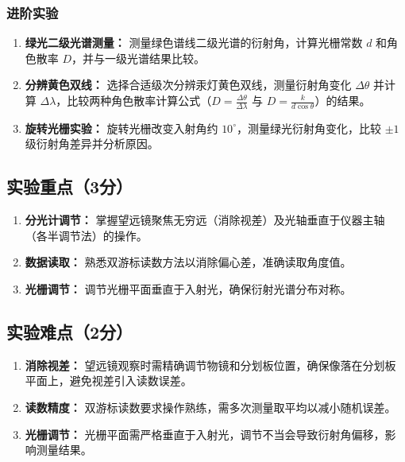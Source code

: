 \documentclass[]{../template/Report}%
\begin{document}
\subsubsection{进阶实验}
\begin{enumerate}
    \item \textbf{绿光二级光谱测量：} 测量绿色谱线二级光谱的衍射角，计算光栅常数 $d$ 和角色散率 $D$，并与一级光谱结果比较。
    \item \textbf{分辨黄色双线：} 选择合适级次分辨汞灯黄色双线，测量衍射角变化 $\Delta \theta$ 并计算 $\Delta \lambda$，比较两种角色散率计算公式（$D = \frac{\Delta \theta}{\Delta \lambda}$ 与 $D = \frac{k}{d \cos \theta}$）的结果。
    \item \textbf{旋转光栅实验：} 旋转光栅改变入射角约 $10^\circ$，测量绿光衍射角变化，比较 $\pm 1$ 级衍射角差异并分析原因。
\end{enumerate}

\subsection{实验重点（3分）}

\begin{enumerate}
    \item \textbf{分光计调节：} 掌握望远镜聚焦无穷远（消除视差）及光轴垂直于仪器主轴（各半调节法）的操作。
    \item \textbf{数据读取：} 熟悉双游标读数方法以消除偏心差，准确读取角度值。
    \item \textbf{光栅调节：} 调节光栅平面垂直于入射光，确保衍射光谱分布对称。
\end{enumerate}

\subsection{实验难点（2分）}
\begin{enumerate}
    \item \textbf{消除视差：} 望远镜观察时需精确调节物镜和分划板位置，确保像落在分划板平面上，避免视差引入读数误差。
    \item \textbf{读数精度：} 双游标读数要求操作熟练，需多次测量取平均以减小随机误差。
    \item \textbf{光栅调节：} 光栅平面需严格垂直于入射光，调节不当会导致衍射角偏移，影响测量结果。
\end{enumerate}
\end{document}
